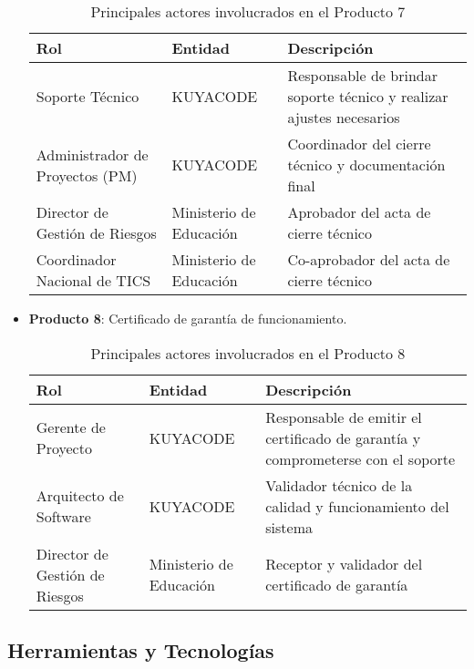 \begin{itemize}
    \begin{table}[h]
        \centering
        \begin{tabular}{|p{3cm}|p{5cm}|p{7cm}|}
            \hline
            \textbf{Rol} & \textbf{Entidad} & \textbf{Descripción} \\
            \hline
            Soporte Técnico & KUYACODE & Responsable de brindar soporte técnico y realizar ajustes necesarios \\
            \hline
            Administrador de Proyectos (PM) & KUYACODE & Coordinador del cierre técnico y documentación final \\
            \hline
            Director de Gestión de Riesgos & Ministerio de Educación & Aprobador del acta de cierre técnico \\
            \hline
            Coordinador Nacional de TICS & Ministerio de Educación & Co-aprobador del acta de cierre técnico \\
            \hline
        \end{tabular}
        \caption{Principales actores involucrados en el Producto 7}
        \label{tab:actores_producto7}
    \end{table}
    \item \textbf{Producto 8}: Certificado de garantía de funcionamiento.
    \begin{table}[ht]
        \centering
        \begin{tabular}{|p{3cm}|p{5cm}|p{7cm}|}
            \hline
            \textbf{Rol} & \textbf{Entidad} & \textbf{Descripción} \\
            \hline
            Gerente de Proyecto & KUYACODE & Responsable de emitir el certificado de garantía y comprometerse con el soporte \\
            \hline
            Arquitecto de Software & KUYACODE & Validador técnico de la calidad y funcionamiento del sistema \\
            \hline
            Director de Gestión de Riesgos & Ministerio de Educación & Receptor y validador del certificado de garantía \\
            \hline
        \end{tabular}
        \caption{Principales actores involucrados en el Producto 8}
        \label{tab:actores_producto8}
    \end{table}
\end{itemize}
\subsection{Herramientas y Tecnologías}
